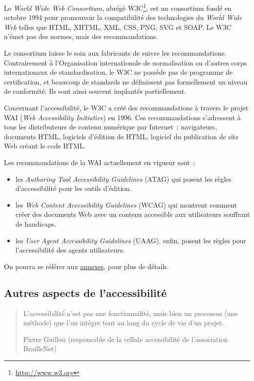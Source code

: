 \documentclass[
]{book}
\providecommand{\tightlist}{%
  \setlength{\itemsep}{0pt}\setlength{\parskip}{0pt}}
\begin{document}
Le \emph{World Wide Web Consortium}, abrégé W3C\footnote{\url{http://www.w3.org}}, est
un consortium fondé en octobre 1994 pour promouvoir la compatibilité des
technologies du \emph{World Wide Web} telles que HTML, XHTML, XML, CSS,
PNG, SVG et SOAP. Le W3C n'émet pas des normes, mais des recommandations.

Le consortium laisse le soin aux fabricants de suivre les recommandations.
Contrairement à l'Organisation internationale de normalisation ou d'autres
corps internationaux de standardisation, le W3C ne possède pas de programme
de certification, et beaucoup de standards ne définissent pas formellement un
niveau de conformité. Ils sont ainsi souvent implantés partiellement.

Concernant l'accessibilité, le W3C a créé des recommandations à travers le
projet WAI (\emph{Web Accessibility Initiative}) en 1996. Ces
recommandations s'adressent à tous les distributeurs de contenu numérique par
Internet~: navigateurs, documents HTML, logiciels d'édition de HTML, logiciel
du publication de site Web créant le code HTML.

Les recommandations de la WAI actuellement en vigueur sont~:

\begin{itemize}
\tightlist
\item
  les \emph{Authoring Tool Accessibility Guidelines}
  (ATAG) qui posent les règles d'accessibilité pour les outils
  d'édition.
\item
  les \emph{Web Content Accessibility Guidelines}
  (WCAG) qui montrent comment créer des documents Web avec un contenu
  accessible aux utilisateurs souffrant de handicaps.
\item
  les \emph{User Agent Accessibility Guidelines}
  (UAAG), enfin, posent les règles pour l'accessibilité des agents
  utilisateurs.
\end{itemize}

On pourra se référer aux \protect\hyperlink{accessibilite}{annexes}, pour plus de détails.

\hypertarget{autres-aspects-de-laccessibilituxe9}{%
\subsection{Autres aspects de l'accessibilité}\label{autres-aspects-de-laccessibilituxe9}}

\begin{quote}
L'accessibilité n'est pas une fonctionnalité, mais bien un processus (une
méthode) que l'on intègre tout au long du cycle de vie d'un projet.

Pierre Guillou (responsable de la cellule accessibilité de l'association
BrailleNet)
\end{quote}
\end{document}
